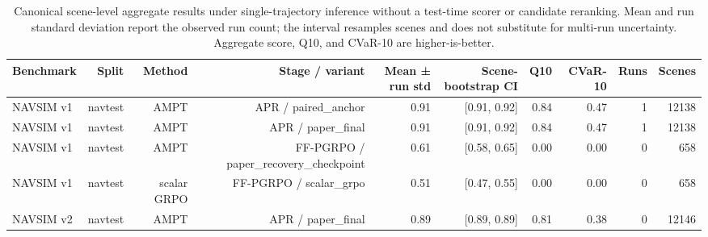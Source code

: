 \begin{table}[t]
\centering
\small
\caption{Canonical scene-level aggregate results under single-trajectory inference without a test-time scorer or candidate reranking. Mean and run standard deviation report the observed run count; the interval resamples scenes and does not substitute for multi-run uncertainty. Aggregate score, Q10, and CVaR-10 are higher-is-better.}
\label{tab:supp_method_statistics}
\begin{tabular}{lrrrrrrrrr}
\toprule
Benchmark & Split & Method & Stage / variant & Mean ± run std & Scene-bootstrap CI & Q10 & CVaR-10 & Runs & Scenes \\
\midrule
NAVSIM v1 & navtest & AMPT & APR / paired\_anchor & 0.91 & [0.91, 0.92] & 0.84 & 0.47 & 1 & 12138 \\
NAVSIM v1 & navtest & AMPT & APR / paper\_final & 0.91 & [0.91, 0.92] & 0.84 & 0.47 & 1 & 12138 \\
NAVSIM v1 & navtest & AMPT & FF-PGRPO / paper\_recovery\_checkpoint & 0.61 & [0.58, 0.65] & 0.00 & 0.00 & 0 & 658 \\
NAVSIM v1 & navtest & scalar GRPO & FF-PGRPO / scalar\_grpo & 0.51 & [0.47, 0.55] & 0.00 & 0.00 & 0 & 658 \\
NAVSIM v2 & navtest & AMPT & APR / paper\_final & 0.89 & [0.89, 0.89] & 0.81 & 0.38 & 0 & 12146 \\
\bottomrule
\end{tabular}
\end{table}
